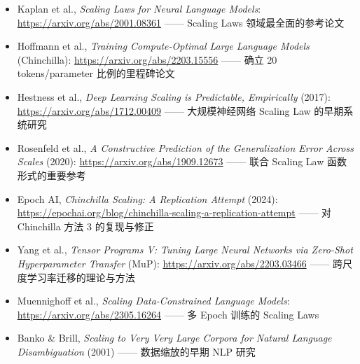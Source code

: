 \begin{itemize}
    \item Kaplan et al., \textit{Scaling Laws for Neural Language Models}: \url{https://arxiv.org/abs/2001.08361} —— Scaling Laws 领域最全面的参考论文
    \item Hoffmann et al., \textit{Training Compute-Optimal Large Language Models} (Chinchilla): \url{https://arxiv.org/abs/2203.15556} —— 确立 20 tokens/parameter 比例的里程碑论文
    \item Hestness et al., \textit{Deep Learning Scaling is Predictable, Empirically} (2017): \url{https://arxiv.org/abs/1712.00409} —— 大规模神经网络 Scaling Law 的早期系统研究
    \item Rosenfeld et al., \textit{A Constructive Prediction of the Generalization Error Across Scales} (2020): \url{https://arxiv.org/abs/1909.12673} —— 联合 Scaling Law 函数形式的重要参考
    \item Epoch AI, \textit{Chinchilla Scaling: A Replication Attempt} (2024): \url{https://epochai.org/blog/chinchilla-scaling-a-replication-attempt} —— 对 Chinchilla 方法 3 的复现与修正
    \item Yang et al., \textit{Tensor Programs V: Tuning Large Neural Networks via Zero-Shot Hyperparameter Transfer} (MuP): \url{https://arxiv.org/abs/2203.03466} —— 跨尺度学习率迁移的理论与方法
    \item Muennighoff et al., \textit{Scaling Data-Constrained Language Models}: \url{https://arxiv.org/abs/2305.16264} —— 多 Epoch 训练的 Scaling Laws
    \item Banko \& Brill, \textit{Scaling to Very Very Large Corpora for Natural Language Disambiguation} (2001) —— 数据缩放的早期 NLP 研究
\end{itemize}


